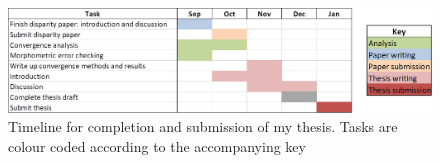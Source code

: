 \documentclass[12pt,a4paper]{article}
\begin{document}




\begin{landscape}
  \begin{figure}[p]
	\centering
	\includegraphics[keepaspectratio=true]{Gannt_July.png}
	\caption{Timeline for completion and submission of my thesis. Tasks are colour coded according to the accompanying key}
	\label{gantt}
  \end{figure}
\end{landscape}



 
\end{document}
